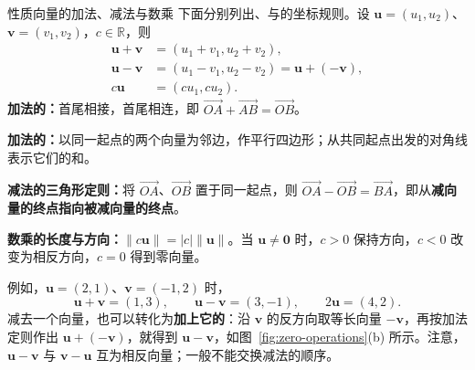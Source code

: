 \documentclass[a4paper,12pt,twoside,openany,fontset=none]{ctexbook}
\newenvironment{property}[1][]{\begin{thmBox}{性质}{#1}}{\end{thmBox}}
\numberwithin{equation}{chapter}
\begin{document}
\begin{property}[向量的加法、减法与数乘]
下面分别列出、与的坐标规则。设 $\boldsymbol{u}=(u_1,u_2)$、$\boldsymbol{v}=(v_1,v_2)$，$c\in\mathbb{R}$，则
\[
\begin{aligned}
\boldsymbol{u}+\boldsymbol{v}&=(u_1+v_1,u_2+v_2),\\
\boldsymbol{u}-\boldsymbol{v}&=(u_1-v_1,u_2-v_2)
                           =\boldsymbol{u}+(-\boldsymbol{v}),\\
c\boldsymbol{u}&=(cu_1,cu_2).
\end{aligned}
\]
\textbf{加法的：}首尾相接，首尾相连，即
$\overrightarrow{OA}+\overrightarrow{AB}=\overrightarrow{OB}$。

\textbf{加法的：}以同一起点的两个向量为邻边，作平行四边形；从共同起点出发的对角线表示它们的和。

\textbf{减法的三角形定则：}将 $\overrightarrow{OA}$、$\overrightarrow{OB}$ 置于同一起点，则
$\overrightarrow{OA}-\overrightarrow{OB}=\overrightarrow{BA}$，即从\textbf{减向量的终点指向被减向量的终点}。

\textbf{数乘的长度与方向：}$\lVert c\boldsymbol{u}\rVert=|c|\lVert\boldsymbol{u}\rVert$。当 $\boldsymbol{u}\ne\boldsymbol{0}$ 时，$c>0$ 保持方向，$c<0$ 改变为相反方向，$c=0$ 得到零向量。
\end{property}

例如，$\boldsymbol{u}=(2,1)$、$\boldsymbol{v}=(-1,2)$ 时，
\[
\boldsymbol{u}+\boldsymbol{v}=(1,3),\qquad
\boldsymbol{u}-\boldsymbol{v}=(3,-1),\qquad
2\boldsymbol{u}=(4,2).
\]
减去一个向量，也可以转化为\textbf{加上它的}：沿 $\boldsymbol{v}$ 的反方向取等长向量 $-\boldsymbol{v}$，再按加法定则作出 $\boldsymbol{u}+(-\boldsymbol{v})$，就得到 $\boldsymbol{u}-\boldsymbol{v}$，如图~\ref{fig:zero-operations}(b) 所示。注意，$\boldsymbol{u}-\boldsymbol{v}$ 与 $\boldsymbol{v}-\boldsymbol{u}$ 互为相反向量；一般不能交换减法的顺序。
\end{document}
